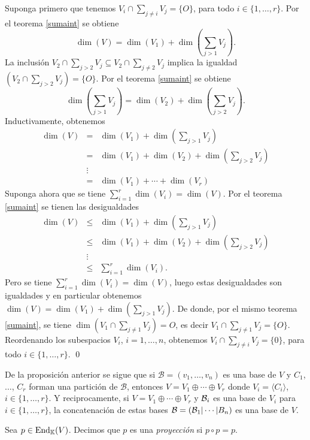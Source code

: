 \dem Suponga primero que tenemos $V_i\cap\sum_{j\ne i} V_j=\{O\}$, para todo $i\in\{1,\ldots,r\}$. Por el teorema \ref{sumaint} se obtiene
$$\dim(V)=\dim(V_1)+\dim\left(\sum_{j>1} V_j\right).$$
La inclusi\'on $V_2\cap\sum_{j>2} V_j\subseteq V_2\cap\sum_{j\ne 2} V_j$ implica la igualdad $\left(V_2\cap\sum_{j> 2} V_j\right)=\{O\}$. Por el teorema \ref{sumaint} se obtiene
$$\dim\left(\sum_{j>1} V_j\right)=\dim(V_2)+\dim\left(\sum_{j>2} V_j\right).$$
Inductivamente, obtenemos 
\begin{eqnarray*}
\dim(V) & = & \dim(V_1)+\dim\left(\sum_{j>1} V_j\right)\\
             & = & \dim(V_1)+\dim(V_2)+\dim\left(\sum_{j>2} V_j\right)\\
             & \vdots & \\
             & = & \dim(V_1)+\cdots+\dim(V_r)          
\end{eqnarray*}
Suponga ahora que se tiene $\sum_{i=1}^r \dim(V_i)=\dim(V)$. Por el teorema \ref{sumaint} se tienen las desigualdades
\begin{eqnarray*}
\dim(V) & \le & \dim(V_1)+\dim\left(\sum_{j>1} V_j\right)\\
             & \le & \dim(V_1)+\dim(V_2)+\dim\left(\sum_{j>2} V_j\right)\\
             & \vdots & \\
             & \le & \sum_{i=1}^r \dim(V_i).      
\end{eqnarray*}
Pero se tiene $\sum_{i=1}^r \dim(V_i)=\dim(V)$, luego estas desigualdades son igualdades y en particular obtenemos $\dim(V)=\dim(V_1)+\dim\left(\sum_{j>1} V_j\right)$. De donde, por el mismo teorema \ref{sumaint}, se tiene $\dim\left(V_1\cap\sum_{j\ne 1} V_j\right)=O$, es decir $V_1\cap\sum_{j\ne 1} V_j=\{O\}$. Reordenando los subespacios $V_i$, $i=1,\ldots,n$, obtenemos $V_i\cap\sum_{j\ne i} V_j=\{0\}$, para todo $i\in\{1,\ldots,r\}$. \qed

\begin{obs}\label{baseparticion}
  De la proposición anterior se sigue que si $\mathcal{B}=(v_1,\ldots,v_n)$ es una base de $V$ y $C_1$, $\ldots$, $C_r$ forman una partición de $\mathcal{B}$, entonces $V=V_1\oplus\cdots\oplus V_r$ donde $V_i=\langle C_i\rangle$, $i\in\{1,\ldots,r\}$. Y reciprocamente, si $V=V_1\oplus\cdots\oplus V_r$ y $\mathcal{B}_i$ es una base de $V_i$ para $i\in\{1,\ldots,r\}$, la concatenación de estas bases $\mathcal{B}=\left(\mathcal{B}_1|\cdots|B_n\right)$ es una base de $V$.
\end{obs}

\begin{defn}
Sea $p\in\operatorname{End}_\mathbb{K}(V)$. Decimos que $p$ es una \emph{proyecci\'on} si $p\circ p=p$.
\end{defn}

